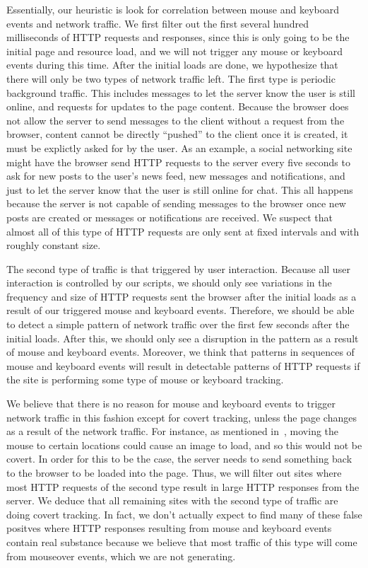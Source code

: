 \documentclass[letterpaper,twocolumn,10pt]{article}
\begin{document}
Essentially, our heuristic is look for correlation between mouse and keyboard events and network traffic. We first filter out the first several hundred milliseconds of HTTP requests and responses, since this is only going to be the initial page and resource load, and we will not trigger any mouse or keyboard events during this time. After the initial loads are done, we hypothesize that there will only be two types of network traffic left. The first type is periodic background traffic. This includes messages to let the server know the user is still online, and requests for updates to the page content. Because the browser does not allow the server to send messages to the client without a request from the browser, content cannot be directly ``pushed'' to the client once it is created, it must be explictly asked for by the user. As an example, a social networking site might have the browser send HTTP requests to the server every five seconds to ask for new posts to the user's news feed, new messages and notifications, and just to let the server know that the user is still online for chat. This all happens because the server is not capable of sending messages to the browser once new posts are created or messages or notifications are received. We suspect that almost all of this type of HTTP requests are only sent at fixed intervals and with roughly constant size.

The second type of traffic is that triggered by user interaction. Because all user interaction is controlled by our scripts, we should only see variations in the frequency and size of HTTP requests sent the browser after the initial loads as a result of our triggered mouse and keyboard events. Therefore, we should be able to detect a simple pattern of network traffic over the first few seconds after the initial loads. After this, we should only see a disruption in the pattern as a result of mouse and keyboard events. Moreover, we think that patterns in sequences of mouse and keyboard events will result in detectable patterns of HTTP requests if the site is performing some type of mouse or keyboard tracking.

We believe that there is no reason for mouse and keyboard events to trigger network traffic in this fashion except for covert tracking, unless the page changes as a result of the network traffic. For instance, as mentioned in~\cite{tainttracking}, moving the mouse to certain locations could cause an image to load, and so this would not be covert. In order for this to be the case, the server needs to send something back to the browser to be loaded into the page. Thus, we will filter out sites where most HTTP requests of the second type result in large HTTP responses from the server. We deduce that all remaining sites with the second type of traffic are doing covert tracking. In fact, we don't actually expect to find many of these false positves where HTTP responses resulting from mouse and keyboard events contain real substance because we believe that most traffic of this type will come from mouseover events, which we are not generating.
\end{document}
